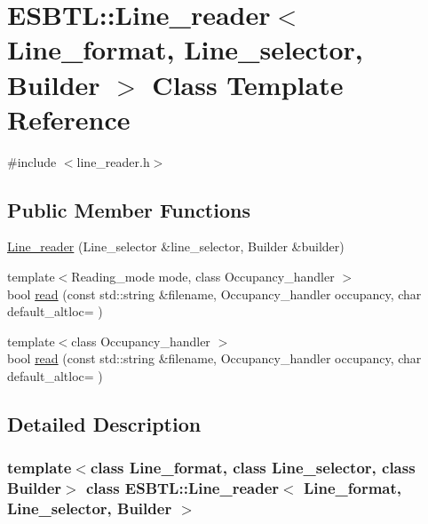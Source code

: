 \hypertarget{classESBTL_1_1Line__reader}{}\section{E\+S\+B\+TL\+:\+:Line\+\_\+reader$<$ Line\+\_\+format, Line\+\_\+selector, Builder $>$ Class Template Reference}
\label{classESBTL_1_1Line__reader}


{\ttfamily \#include $<$line\+\_\+reader.\+h$>$}

\subsection*{Public Member Functions}
\begin{DoxyCompactItemize}
\item 
\hyperlink{classESBTL_1_1Line__reader_a1bf419275695ceff1bd89bae72013f9e}{Line\+\_\+reader} (Line\+\_\+selector \&line\+\_\+selector, Builder \&builder)
\item 
{\footnotesize template$<$Reading\+\_\+mode mode, class Occupancy\+\_\+handler $>$ }\\bool \hyperlink{classESBTL_1_1Line__reader_aaf4f352f79c0bc1fc2afb52afd4f751f}{read} (const std\+::string \&filename, Occupancy\+\_\+handler occupancy, char default\+\_\+altloc=\textquotesingle{} \textquotesingle{})
\item 
{\footnotesize template$<$class Occupancy\+\_\+handler $>$ }\\bool \hyperlink{classESBTL_1_1Line__reader_acbdbb6a44e3132a54dae150158462470}{read} (const std\+::string \&filename, Occupancy\+\_\+handler occupancy, char default\+\_\+altloc=\textquotesingle{} \textquotesingle{})
\end{DoxyCompactItemize}


\subsection{Detailed Description}
\subsubsection*{template$<$class Line\+\_\+format, class Line\+\_\+selector, class Builder$>$\newline
class E\+S\+B\+T\+L\+::\+Line\+\_\+reader$<$ Line\+\_\+format, Line\+\_\+selector, Builder $>$}

